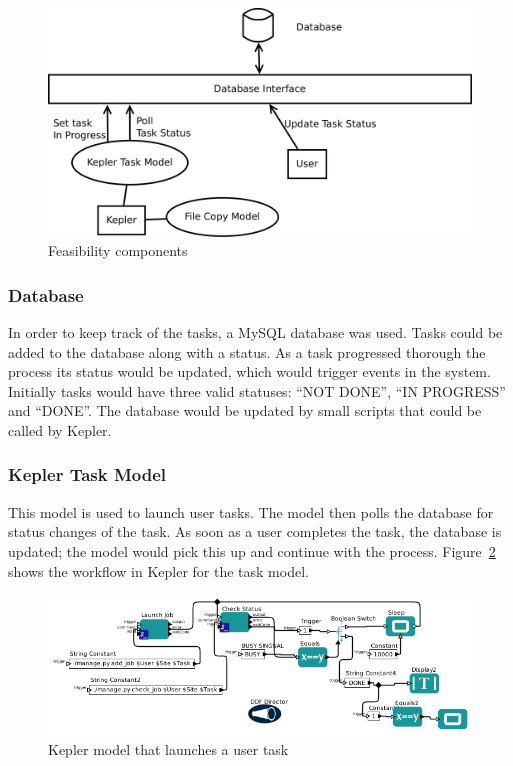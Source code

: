 \begin{figure}[!h]
    \begin{center}
        \includegraphics[scale=0.35]{figures/iter1_impl.pdf}
    \end{center}
    \caption{Feasibility components}
    \label{iter1_overview}
\end{figure}

\subsubsection{Database}
In order to keep track of the tasks, a MySQL database was used. Tasks could be added
to the database along with a status. As a task progressed thorough the process its
status would be updated, which would trigger events in the system. Initially tasks would
have three valid statuses: ``NOT DONE'', ``IN PROGRESS'' and ``DONE''. The database would
be updated by small scripts that could be called by Kepler.

\subsubsection{Kepler Task Model}

This model is used to launch user tasks. The model then polls the database for
status changes of the task. As soon as a user completes the task, the
database is updated; the model would pick this up and continue with the process.
Figure~\ref{kepler_task_model} shows the workflow in Kepler for the task model.

\begin{figure}[!h]
    \begin{center}
        \includegraphics[scale=0.6]{figures/task_model_kepler.png}
    \end{center}
    \caption{Kepler model that launches a user task}
    \label{kepler_task_model}
\end{figure}


